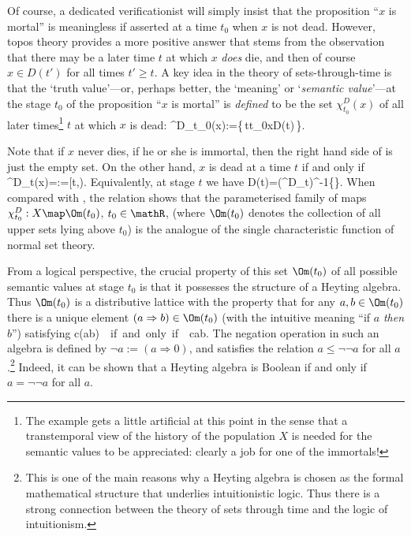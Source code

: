 	Of course, a dedicated verificationist will simply insist that
the proposition ``$x$ is mortal'' is meaningless if asserted at a
time $t_0$ when $x$ is not dead. However, topos theory provides a
more positive answer that stems from the observation that there may
be a later time $t$ at which $x$ {\em does\/} die, and then of
course $x\in D(t')$ for all times $t'\geq t$. A key idea in the
theory of sets-through-time is that the `truth value'---or, perhaps
better, the `meaning' or `{\em semantic value\/}'---at the stage
$t_0$ of the proposition ``$x$ is mortal'' is {\em defined\/} to be
the set $\chi^D_{t_0}(x)$ of all later times\footnote{The example
gets a little artificial at this point in the sense that a
transtemporal view of the history of the population $X$ is needed
for the semantic values to be appreciated: clearly a job for one of
the immortals!} $t$ at which $x$ is dead:
\beq	
	\chi^D_{t_0}(x):=\{\,t\geq t_0\mid x\in D(t)\,\}.	\label{Def:chiD}  
\eeq

	Note that if $x$ never dies, \ie if he or she is immortal, then
the right hand side of  is just the empty set. On the
other hand, $x$ is dead at a time $t$ if and only if
\beq
		\chi^D_t(x)=:=[t,\infty).		\label{chiDt=up(t)}
\eeq
Equivalently, at stage $t$ we have
\beq
		D(t)=(\chi^D_t)^{-1}\{\}.	\label{D(t)=chiD(t)-1}
\eeq
When compared with , the relation 
shows that the parameterised family of maps
$\chi^D_{t_0}:X\map\Om(t_0)$, $t_0\in\mathR$, (where $\Om(t_0)$
denotes the collection of all upper sets lying above $t_0$) is the
analogue of the single characteristic function of normal set theory.

	From a logical perspective, the crucial property of this set
$\Om(t_0)$ of all possible semantic values at stage $t_0$ is that it
possesses the structure of a Heyting algebra. Thus $\Om(t_0)$ is a
distributive lattice with the property that for any $a,b\in\Om(t_0)$
there is a unique element $(a\Rightarrow b)\in\Om(t_0)$ (with the
intuitive meaning ``if $a$ {\em then\/} $b$'') satisfying
\beq
			c\leq(a\Rightarrow b)\ \mbox{ if and only if }\ 
					c\land a\leq b.
\eeq
The negation operation in such an algebra is defined by $\neg
a:=(a\Rightarrow0)$, and satisfies the relation $a\leq\neg\neg a$
for all $a$.\footnote{This is one of the main reasons why a Heyting
algebra is chosen as the formal mathematical structure that
underlies intuitionistic logic. Thus there is a strong connection
between the theory of sets through time and the logic of
intuitionism.} Indeed, it can be shown that a Heyting algebra is
Boolean if and only if $a=\neg\neg a$ for all $a$.


